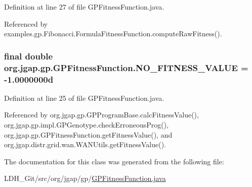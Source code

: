 Definition at line 27 of file G\-P\-Fitness\-Function.\-java.



Referenced by examples.\-gp.\-Fibonacci.\-Formula\-Fitness\-Function.\-compute\-Raw\-Fitness().

\hypertarget{classorg_1_1jgap_1_1gp_1_1_g_p_fitness_function_a1044d8e90c0a44f22c74088af71a931f}{
\subsubsection[{N\-O\-\_\-\-F\-I\-T\-N\-E\-S\-S\-\_\-\-V\-A\-L\-U\-E}]{\setlength{\rightskip}{0pt plus 5cm}final double org.\-jgap.\-gp.\-G\-P\-Fitness\-Function.\-N\-O\-\_\-\-F\-I\-T\-N\-E\-S\-S\-\_\-\-V\-A\-L\-U\-E = -\/1.\-0000000d\hspace{0.3cm}{\ttfamily [static]}}}\label{classorg_1_1jgap_1_1gp_1_1_g_p_fitness_function_a1044d8e90c0a44f22c74088af71a931f}


Definition at line 25 of file G\-P\-Fitness\-Function.\-java.



Referenced by org.\-jgap.\-gp.\-G\-P\-Program\-Base.\-calc\-Fitness\-Value(), org.\-jgap.\-gp.\-impl.\-G\-P\-Genotype.\-check\-Erroneous\-Prog(), org.\-jgap.\-gp.\-G\-P\-Fitness\-Function.\-get\-Fitness\-Value(), and org.\-jgap.\-distr.\-grid.\-wan.\-W\-A\-N\-Utils.\-get\-Fitness\-Value().



The documentation for this class was generated from the following file\-:\begin{DoxyCompactItemize}
\item 
L\-D\-H\-\_\-\-Git/src/org/jgap/gp/\hyperlink{_g_p_fitness_function_8java}{G\-P\-Fitness\-Function.\-java}\end{DoxyCompactItemize}
